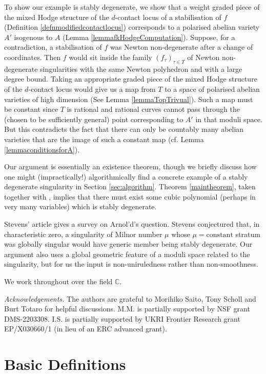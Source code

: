 \documentclass[11pt]{amsart}
\newcommand{\bC}{\mathbb{C}}
\numberwithin{equation}{section}
\begin{document}
To show our example is stably degenerate, we show that a weight graded piece of the mixed Hodge structure of the $d$-contact locus of a stabilisation of $f$ (Definition \ref{defnmodifiedcontactlocus}) corresponds to a polarised abelian variety $A'$ isogenous to $A$  (Lemma \ref{lemmafkHodgeComputation}).
Suppose, for a contradiction, a stabilisation of $f$ was Newton non-degenerate after a change of coordinates. Then $f$ would sit inside the family $(f_\tau)_{\tau \in T}$ of Newton non-degenerate singularities
with the same Newton polyhedron and with a large degree bound.
Taking an appropriate graded piece of the mixed Hodge structure of the $d$-contact locus would give us a map from $T$ to a space of  polarised abelian varieties of high dimension (See Lemma \ref{lemmaTopTrivual}). Such a map must be constant since $T$ is rational and rational curves cannot pass through the (chosen to be sufficiently general) point corresponding to $A'$ in that moduli space.
But this contradicts the fact that there can only be countably many abelian varieties that are the image of such a constant map (cf.  Lemma \ref{lemmaconditionsforA}).

Our argument is essentially an existence theorem, though we briefly discuss how one might (impractically!) algorithmically find a concrete example of a stably degenerate singularity in Section \ref{sec:algorithm}. Theorem \ref{maintheorem}, taken together with \cite[Corollary 3.2]{stevens2021conjectures}, implies that there must exist some cubic polynomial (perhaps in very many variables) which is stably degenerate.

Stevens' article \cite{stevens2021conjectures} gives a survey on Arnol'd's question. Stevens conjectured that, in characteristic zero, a singularity of Milnor number $\mu$ whose $\mu=\mathrm{constant}$ stratum was globally singular would have generic member  being stably degenerate. Our argument also uses a global geometric feature of a  moduli space related to the singularity, but for us the input is non-uniruledness rather than non-smoothness.

We work throughout over the field $\bC$.

\noindent \emph{Acknowledgements.} The authors are grateful to Morihiko Saito, Tony Scholl and Burt Totaro for helpful discussions.  M.M. is partially supported by NSF grant DMS-2203308. I.S. is partially supported by UKRI Frontier Research grant EP/X030660/1 (in lieu of an ERC advanced grant).

\section{Basic Definitions}
\end{document}
